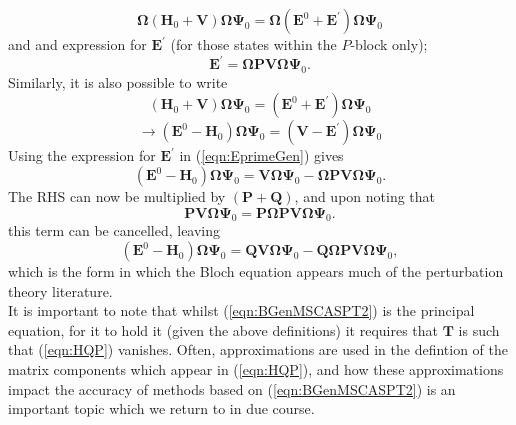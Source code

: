 \documentclass[12pt]{article}
\begin{document}
\begin{equation}
\boldsymbol{\Omega}(\mathbf{H}_{0}+\mathbf{V})\boldsymbol{\Omega}\mathbf{\Psi}_{0} =
\boldsymbol{\Omega}(\mathbf{E}^{0}+\mathbf{E}^{'})\boldsymbol{\Omega}\mathbf{\Psi}_{0}
\label{eqn:WWperturbedHE}
\end{equation}
and and expression for $\mathbf{E}^{'}$ (for those states within the $P$-block only);
\begin{equation}
\mathbf{E}^{'} = \boldsymbol{\Omega}\mathbf{P}\mathbf{V}\boldsymbol{\Omega}\mathbf{\Psi}_{0}.
\label{eqn:EprimeGen}
\end{equation}
Similarly, it is also possible to write
\begin{equation*}
(\mathbf{H}_{0}+\mathbf{V})\boldsymbol{\Omega}\mathbf{\Psi}_{0} =
(\mathbf{E}^{0}+\mathbf{E}^{'})\boldsymbol{\Omega}\mathbf{\Psi}_{0}
\end{equation*}
\begin{equation}
\rightarrow
(\mathbf{E}^{0}-\mathbf{H}_{0})\boldsymbol{\Omega}\mathbf{\Psi}_{0} =
 (\mathbf{V}-\mathbf{E}^{'})\boldsymbol{\Omega}\mathbf{\Psi}_{0} 
\label{eqn:WperturbedHE}
\end{equation}
Using the expression for $\mathbf{E}^{'}$ in  (\ref{eqn:EprimeGen}) gives
\begin{equation}
(\mathbf{E}^{0}-\mathbf{H}_{0})\boldsymbol{\Omega}\mathbf{\Psi}_{0} =
\mathbf{V}\boldsymbol{\Omega}\mathbf{\Psi}_{0} - 
\boldsymbol{\Omega}\mathbf{P}\mathbf{V}\boldsymbol{\Omega}\mathbf{\Psi}_{0}.
\label{eqn:BGenIntermediate}
\end{equation}
The RHS can now be multiplied by $(\mathbf{P}+\mathbf{Q})$,  and upon noting that
\begin{equation*}
\mathbf{P}\mathbf{V}\boldsymbol{\Omega}\mathbf{\Psi}_{0} = \mathbf{P}\boldsymbol{\Omega}\mathbf{P}\mathbf{V}\boldsymbol{\Omega}\mathbf{\Psi}_{0}.
\end{equation*}
this term can be cancelled, leaving
\begin{equation}
(\mathbf{E}^{0}-\mathbf{H}_{0})\boldsymbol{\Omega}\mathbf{\Psi}_{0} =
\mathbf{Q}\mathbf{V}\boldsymbol{\Omega}\mathbf{\Psi}_{0} - 
\mathbf{Q}\boldsymbol{\Omega}\mathbf{P}\mathbf{V}\boldsymbol{\Omega}\mathbf{\Psi}_{0},
\label{eqn:BGenMSCASPT2}
\end{equation}
which is the form in which the Bloch equation appears much of the perturbation theory literature.\\

\noindent It is important to note that whilst (\ref{eqn:BGenMSCASPT2}) is the principal equation,
for it to hold it (given the above definitions) it requires that $\mathbf{T}$ is such that
(\ref{eqn:HQP}) vanishes. Often, approximations are used in the defintion of the matrix components
which appear in (\ref{eqn:HQP}), and how these approximations impact the accuracy of methods based on
(\ref{eqn:BGenMSCASPT2}) is an important topic which we return to in due course.
\end{document}
